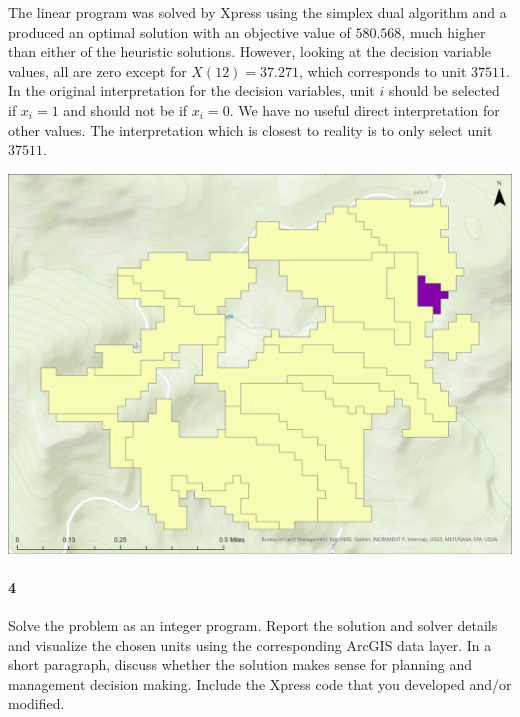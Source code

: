 \documentclass[12pt]{article}
\newenvironment{fullbox}{\begin{lrbox}{\savefullbox}\begin{minipage}{\dimexpr\textwidth-2\fboxsep\relax}}{\end{minipage}\end{lrbox}\begin{center}\framebox[\textwidth]{\usebox{\savefullbox}}\end{center}}
\newenvironment{pbox}[1][]{\begin{fullbox}\ifx#1\empty\else\paragraph{#1}\fi}{\end{fullbox}}
\theoremstyle{definition}
\begin{document}
The linear program was solved by Xpress using the simplex dual algorithm and a produced an optimal solution with an objective value of $580.568$, much higher than either of the heuristic solutions. However, looking at the decision variable values, all are zero except for $X(12) = 37.271$, which corresponds to unit $37511$. In the original interpretation for the decision variables, unit $i$ should be selected if $x_i = 1$ and should not be if $x_i = 0$. We have no useful direct interpretation for other values. The interpretation which is closest to reality is to only select unit $37511$.

\begin{center}
    \includegraphics[width=\textwidth]{map3.png}
\end{center}




\newpage
\begin{pbox}[4]
     Solve the problem as an integer program. Report the solution and solver details and visualize the chosen units using the corresponding ArcGIS data layer. In a short paragraph, discuss whether the solution makes sense for planning and management decision making. Include the Xpress code that you developed and/or modified.
\end{pbox}
\end{document}
